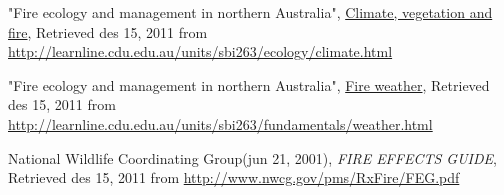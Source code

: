 \begin{thebibliography}{4}
 "Fire ecology and management in northern Australia", \underline{Climate, vegetation and fire}, Retrieved des 15, 2011 from \url{http://learnline.cdu.edu.au/units/sbi263/ecology/climate.html}

 "Fire ecology and management in northern Australia", \underline{Fire weather}, Retrieved des 15, 2011 from \url{http://learnline.cdu.edu.au/units/sbi263/fundamentals/weather.html}

 National Wildlife Coordinating Group(jun 21, 2001), \emph{FIRE EFFECTS GUIDE}, Retrieved des 15, 2011 from \url{http://www.nwcg.gov/pms/RxFire/FEG.pdf}

\end{thebibliography}
